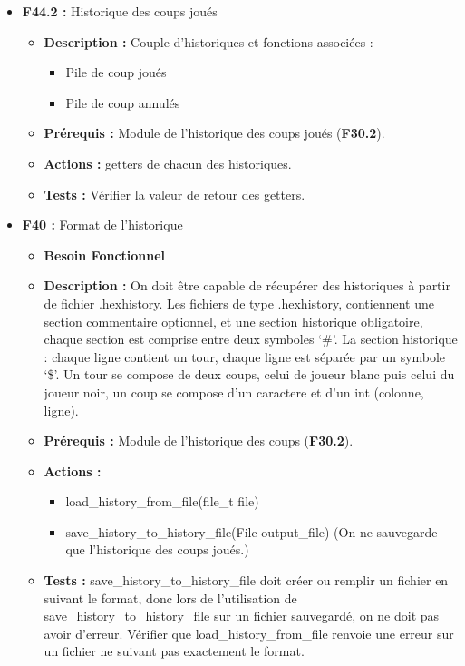 \documentclass{article}
\begin{document}
\medskip
\begin{itemize}
    \item \textbf{F44.2 :} Historique des coups joués
    \begin{itemize}
        \item \textbf{Description :} Couple d’historiques et fonctions associées :
        \begin{itemize}
            \item Pile de coup joués
            \item Pile de coup annulés 
        \end{itemize}
        \item \textbf{Prérequis :} Module de l'historique des coups joués (\textbf{F30.2}).
        \item \textbf{Actions :} getters de chacun des historiques.
        \item \textbf{Tests :} Vérifier la valeur de retour des getters.
    \end{itemize}
\bigskip
    \item \textbf{F40 :} Format de l’historique
    \begin{itemize}
        \item \textbf{Besoin Fonctionnel}
        \item \textbf{Description :} On doit être capable de récupérer des historiques à partir de fichier .hexhistory. Les fichiers de type .hexhistory, contiennent une section commentaire optionnel, et une section historique obligatoire, chaque section est comprise entre deux symboles ‘\#’. La section historique : chaque ligne contient un tour, chaque ligne est séparée par un symbole ‘\$’. Un tour se compose de deux coups, celui de joueur blanc puis celui du joueur noir, un coup se compose d’un caractere et d’un int (colonne, ligne). 
        \item \textbf{Prérequis :} Module de l'historique des coups (\textbf{F30.2}).
        \item \textbf{Actions :}
        \begin{itemize}
            \item load\_history\_from\_file(file\_t file)
            \item save\_history\_to\_history\_file(File output\_file) (On ne sauvegarde que l’historique des coups joués.)
        \end{itemize}
        \item \textbf{Tests :} save\_history\_to\_history\_file doit créer ou remplir un fichier en suivant le format, donc lors de l’utilisation de save\_history\_to\_history\_file sur un fichier sauvegardé, on ne doit pas avoir d’erreur. Vérifier que load\_history\_from\_file renvoie une erreur sur un fichier ne suivant pas exactement le format. 

\end{itemize}
\end{itemize}
\end{document}
